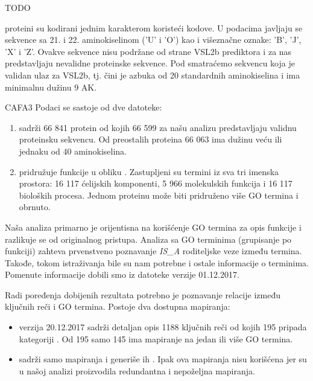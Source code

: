TODO


\swissprot proteini su kodirani jednim karakterom koristeći 
kodove.  U podacima javljaju se sekvence sa  21. i 22. aminokiselinom ('U' i 'O')
kao i  višeznačne oznake: 'B', 'J', 'X' i 'Z'.  Ovakve sekvence nisu podržane od
strane VSL2b prediktora i za nas predstavljaju nevalidne proteinske sekvence. Pod
 smatraćemo sekvencu koja je validan
ulaz za VSL2b, tj. čini je azbuka od 20 standardnih aminokiselina i
ima minimalnu dužinu 9 AK.

CAFA3 Podaci se sastoje od dve datoteke:
\begin{enumerate}
  \item {}  sadrži 66 841 protein od kojih 66 599
    za našu analizu predstavljaju validnu proteinsku sekvencu. Od preostalih
    proteina 66 063 ima dužinu veću ili jednaku od 40 aminokiselina.
  \item {} pridružuje funkcije u obliku 
    . Zastupljeni su termini iz sva tri imenska prostora:
    16 117 ćelijskih komponenti, 5 966 molekulskih funkcija i 16 117 bioloških
    procesa. Jednom proteinu može biti pridruženo više GO termina i obrnuto.
\end{enumerate}

Naša analiza primarno je orijentisna na korišćenje GO termina za opis funkcije
i razlikuje se od originalnog pristupa.  Analiza sa GO terminima (grupisanje po
funkciji) zahteva prvenstveno poznavanje \textit{IS\_A} roditeljske veze između
termina. Takođe, tokom istraživanja bile su nam potrebne i ostale informacije o
terminima. Pomenute informacije dobili smo iz datoteke \cite{go_obo}
verzije 01.12.2017.

Radi poređenja dobijenih rezultata potrebno je poznavanje relacije između
ključnih reči i GO termina. Postoje dva dostupna mapiranja:
\begin{itemize}
  \item \cite{keywlist_txt} verzija 20.12.2017 sadrži
    detaljan opis 1188 ključnih reči od kojih 195 pripada kategoriji
    .  Od 195 samo 145 ima mapiranje na jedan ili
    više GO termina.
  \item \cite{uniprotkb_kw2go} sadrži samo
    mapiranja i generiše ih  \parencite{Barrell2009}.
    Ipak ova mapiranja nisu korišćena jer su u našoj analizi proizvodila
    redundantna i nepoželjna mapiranja.
\end{itemize}

